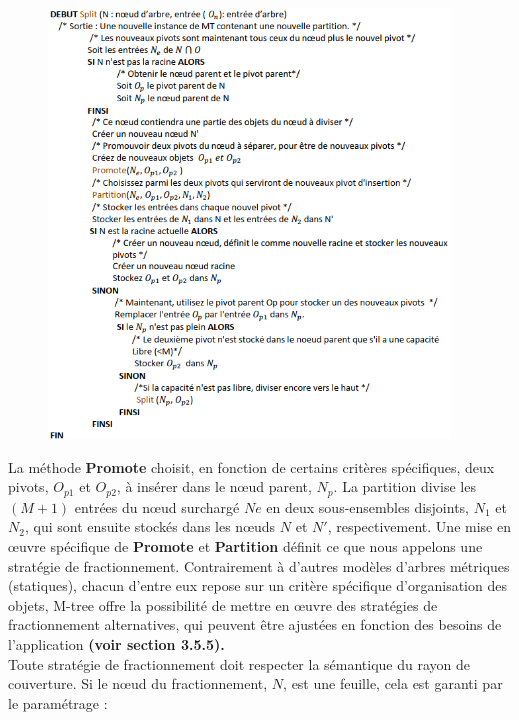 \begin{figure}[H]
	\centering
	\includegraphics[width=0.95\textwidth]{Figures/split.png} %
\end{figure}

La méthode \textbf{Promote} choisit, en fonction de certains critères spécifiques, deux pivots, $ O_{p1} $ et $  O_{p2} $, à insérer dans le nœud parent, $ N_p $. La partition divise les $ (M + 1) $ entrées du nœud surchargé $ Ne $ en deux sous-ensembles disjoints, $ N_1 $ et $ N_2 $, qui sont ensuite stockés dans les nœuds $ N $ et $ N' $, respectivement. Une mise en œuvre spécifique de \textbf{Promote} et \textbf{Partition} définit ce que nous appelons une stratégie de fractionnement. Contrairement à d'autres modèles d'arbres métriques (statiques), chacun d'entre eux repose sur un critère spécifique d'organisation des objets, M-tree offre la possibilité de mettre en œuvre des stratégies de fractionnement alternatives, qui peuvent être ajustées en fonction des besoins de l'application \textbf{(voir section 3.5.5).}\\

Toute stratégie de fractionnement doit respecter la sémantique du rayon de couverture. Si le nœud du fractionnement, $ N $, est une feuille, cela est garanti par le paramétrage :

